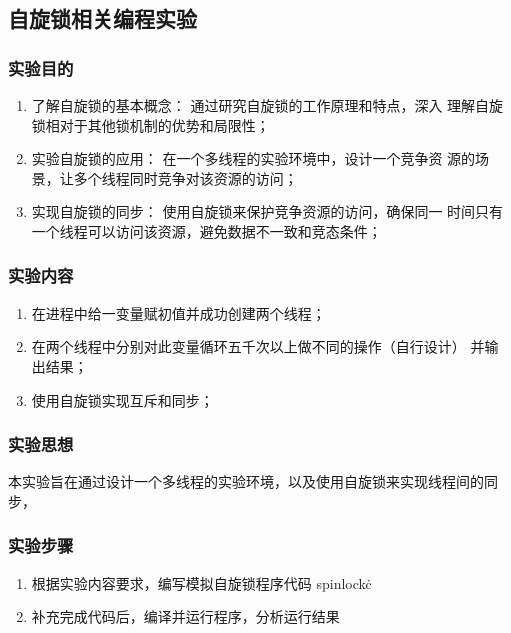 \documentclass{article}
\begin{document}
    \subsection{自旋锁相关编程实验}
    \subsubsection{实验目的}

    \begin{enumerate}
        \item 了解自旋锁的基本概念： 通过研究自旋锁的工作原理和特点，深入
        理解自旋锁相对于其他锁机制的优势和局限性；
        \item 实验自旋锁的应用： 在一个多线程的实验环境中，设计一个竞争资
        源的场景，让多个线程同时竞争对该资源的访问；
        \item 实现自旋锁的同步： 使用自旋锁来保护竞争资源的访问，确保同一
        时间只有一个线程可以访问该资源，避免数据不一致和竞态条件；
    \end{enumerate}


    \subsubsection{实验内容}


    \begin{enumerate}
        \item 在进程中给一变量赋初值并成功创建两个线程；
        \item 在两个线程中分别对此变量循环五千次以上做不同的操作（自行设计） 并输出结果；
        \item 使用自旋锁实现互斥和同步；
    \end{enumerate}

    \subsubsection{实验思想}
    本实验旨在通过设计一个多线程的实验环境，以及使用自旋锁来实现线程间的同步，

    \subsubsection{实验步骤}

    \begin{enumerate}
        \item 根据实验内容要求，编写模拟自旋锁程序代码 spinlock\.c
        \item 补充完成代码后，编译并运行程序，分析运行结果
    \end{enumerate}
\end{document}
